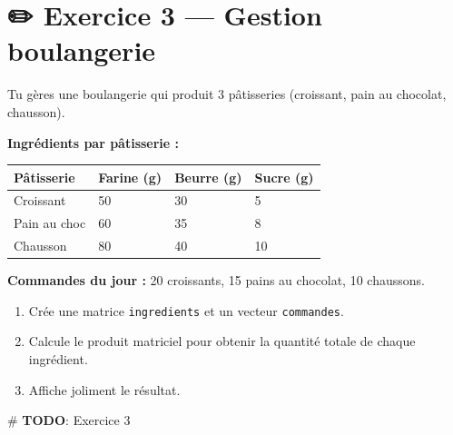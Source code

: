 \documentclass[
  french,
  11pt,
  a4paper,
]{scrbook}
\newenvironment{Shaded}{}{}
\newcommand{\AlertTok}[1]{\textcolor[rgb]{1.00,0.33,0.33}{\textbf{#1}}}
\newcommand{\CommentTok}[1]{\textcolor[rgb]{0.42,0.45,0.49}{#1}}
\newcounter{none} %
\providecommand{\tightlist}{%
  \setlength{\itemsep}{0pt}\setlength{\parskip}{0pt}}
\begin{document}
\section{✏️ Exercice 3 --- Gestion
boulangerie}\label{exercice-3-gestion-boulangerie}

\begin{tcolorbox}[enhanced jigsaw, arc=.35mm, bottomrule=.15mm, bottomtitle=1mm, breakable, colback=white, colbacktitle=quarto-callout-note-color!10!white, colframe=quarto-callout-note-color-frame, coltitle=black, left=2mm, leftrule=.75mm, opacityback=0, opacitybacktitle=0.6, rightrule=.15mm, title={📝 Énoncé}, titlerule=0mm, toprule=.15mm, toptitle=1mm]

Tu gères une boulangerie qui produit 3 pâtisseries (croissant, pain au
chocolat, chausson).

\textbf{Ingrédients par pâtisserie :}

{\def\LTcaptype{none} %
\begin{longtable}[]{@{}llll@{}}
\toprule\noalign{}
Pâtisserie & Farine (g) & Beurre (g) & Sucre (g) \\
\midrule\noalign{}
\endhead
\bottomrule\noalign{}
\endlastfoot
Croissant & 50 & 30 & 5 \\
Pain au choc & 60 & 35 & 8 \\
Chausson & 80 & 40 & 10 \\
\end{longtable}
}

\textbf{Commandes du jour :} 20 croissants, 15 pains au chocolat, 10
chaussons.

\begin{enumerate}
\def\labelenumi{\arabic{enumi}.}
\tightlist
\item
  Crée une matrice \texttt{ingredients} et un vecteur
  \texttt{commandes}.
\item
  Calcule le produit matriciel pour obtenir la quantité totale de chaque
  ingrédient.
\item
  Affiche joliment le résultat.
\end{enumerate}

\end{tcolorbox}

\begin{Shaded}
\begin{Highlighting}[]
\CommentTok{\# }\AlertTok{TODO}\CommentTok{: Exercice 3}
\end{Highlighting}
\end{Shaded}
\end{document}
